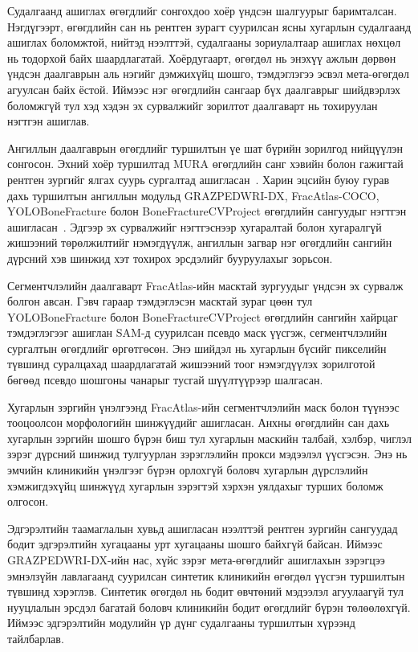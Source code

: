 Судалгаанд ашиглах өгөгдлийг сонгохдоо хоёр үндсэн шалгуурыг баримталсан. Нэгдүгээрт, өгөгдлийн сан нь рентген зурагт суурилсан ясны хугарлын судалгаанд ашиглах боломжтой, нийтэд нээлттэй, судалгааны зориулалтаар ашиглах нөхцөл нь тодорхой байх шаардлагатай. Хоёрдугаарт, өгөгдөл нь энэхүү ажлын дөрвөн үндсэн даалгаврын аль нэгийг дэмжихүйц шошго, тэмдэглэгээ эсвэл мета-өгөгдөл агуулсан байх ёстой. Иймээс нэг өгөгдлийн сангаар бүх даалгаврыг шийдвэрлэх боломжгүй тул хэд хэдэн эх сурвалжийг зорилтот даалгаварт нь тохируулан нэгтгэн ашиглав.

Ангиллын даалгаврын өгөгдлийг туршилтын үе шат бүрийн зорилгод нийцүүлэн сонгосон. Эхний хоёр туршилтад MURA өгөгдлийн санг хэвийн болон гажигтай рентген зургийг ялгах суурь сургалтад ашигласан~\cite{ref39}. Харин эцсийн буюу гурав дахь туршилтын ангиллын модульд GRAZPEDWRI-DX, FracAtlas-COCO, YOLOBoneFracture болон BoneFractureCVProject өгөгдлийн сангуудыг нэгтгэн ашигласан~\cite{ref40,ref41}. Эдгээр эх сурвалжийг нэгтгэснээр хугаралтай болон хугаралгүй жишээний төрөлжилтийг нэмэгдүүлж, ангиллын загвар нэг өгөгдлийн сангийн дүрсний хэв шинжид хэт тохирох эрсдэлийг бууруулахыг зорьсон.

Сегментчлэлийн даалгаварт FracAtlas-ийн масктай зургуудыг үндсэн эх сурвалж болгон авсан. Гэвч гараар тэмдэглэсэн масктай зураг цөөн тул YOLOBoneFracture болон BoneFractureCVProject өгөгдлийн сангийн хайрцаг тэмдэглэгээг ашиглан SAM-д суурилсан псевдо маск үүсгэж, сегментчлэлийн сургалтын өгөгдлийг өргөтгөсөн. Энэ шийдэл нь хугарлын бүсийг пикселийн түвшинд суралцахад шаардлагатай жишээний тоог нэмэгдүүлэх зорилготой бөгөөд псевдо шошгоны чанарыг тусгай шүүлтүүрээр шалгасан.

Хугарлын зэргийн үнэлгээнд FracAtlas-ийн сегментчлэлийн маск болон түүнээс тооцоолсон морфологийн шинжүүдийг ашигласан. Анхны өгөгдлийн сан дахь хугарлын зэргийн шошго бүрэн биш тул хугарлын маскийн талбай, хэлбэр, чиглэл зэрэг дүрсний шинжид тулгуурлан зэрэглэлийн прокси мэдээлэл үүсгэсэн. Энэ нь эмчийн клиникийн үнэлгээг бүрэн орлохгүй боловч хугарлын дүрслэлийн хэмжигдэхүйц шинжүүд хугарлын зэрэгтэй хэрхэн уялдахыг турших боломж олгосон.

Эдгэрэлтийн таамаглалын хувьд ашигласан нээлттэй рентген зургийн сангуудад бодит эдгэрэлтийн хугацааны урт хугацааны шошго байхгүй байсан. Иймээс GRAZPEDWRI-DX-ийн нас, хүйс зэрэг мета-өгөгдлийг ашиглахын зэрэгцээ эмнэлзүйн лавлагаанд суурилсан синтетик клиникийн өгөгдөл үүсгэн туршилтын түвшинд хэрэглэв. Синтетик өгөгдөл нь бодит өвчтөний мэдээлэл агуулаагүй тул нууцлалын эрсдэл багатай боловч клиникийн бодит өгөгдлийг бүрэн төлөөлөхгүй. Иймээс эдгэрэлтийн модулийн үр дүнг судалгааны туршилтын хүрээнд тайлбарлав.

